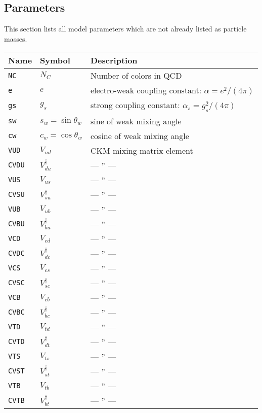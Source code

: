 \subsection{Parameters}
This section lists all model parameters which are not already
listed as particle masses.

\medskip
\begin{longtable}{|l|l|l|}
\hline
Name & Symbol & Description\\
\hline
\texttt{NC }& $N_C$ & Number of colors in QCD\\
\texttt{e }& $e$ & electro-weak coupling constant: $\alpha=e^2/(4\pi)$\\
\texttt{gs }& $g_s$ & strong coupling constant: $\alpha_s=g_s^2/(4\pi)$\\
\texttt{sw }& $s_w=\sin\theta_w$ & sine of weak mixing angle\\
\texttt{cw }& $c_w=\cos\theta_w$ & cosine of weak mixing angle\\
\texttt{VUD }& $V_{ud}$ & CKM mixing matrix element\\
\texttt{CVDU }& $V_{du}^{\dagger}$ & --- '' ---\\
\texttt{VUS }& $V_{us}$ & --- '' ---\\
\texttt{CVSU }& $V_{su}^{\dagger}$ & --- '' ---\\
\texttt{VUB }& $V_{ub}$ & --- '' ---\\
\texttt{CVBU }& $V_{bu}^{\dagger}$ & --- '' ---\\
\texttt{VCD }& $V_{cd}$ & --- '' ---\\
\texttt{CVDC }& $V_{dc}^{\dagger}$ & --- '' ---\\
\texttt{VCS }& $V_{cs}$ & --- '' ---\\
\texttt{CVSC }& $V_{sc}^{\dagger}$ & --- '' ---\\
\texttt{VCB }& $V_{cb}$ & --- '' ---\\
\texttt{CVBC }& $V_{bc}^{\dagger}$ & --- '' ---\\
\texttt{VTD }& $V_{td}$ & --- '' ---\\
\texttt{CVTD }& $V_{dt}^{\dagger}$ & --- '' ---\\
\texttt{VTS }& $V_{ts}$ & --- '' ---\\
\texttt{CVST }& $V_{st}^{\dagger}$ & --- '' ---\\
\texttt{VTB }& $V_{tb}$ & --- '' ---\\
\texttt{CVTB }& $V_{bt}^{\dagger}$ & --- '' ---\\
\hline
\end{longtable}
\renewcommand{\arraystretch}{1.25}




